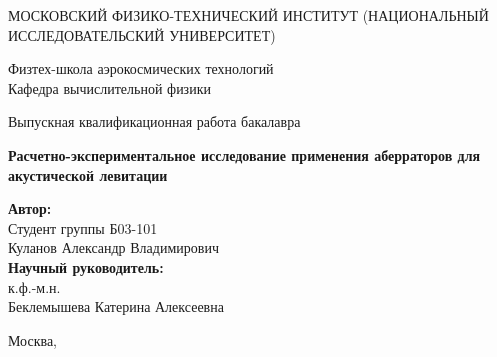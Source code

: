 \begin{center}
    \large МОСКОВСКИЙ ФИЗИКО-ТЕХНИЧЕСКИЙ ИНСТИТУТ (НАЦИОНАЛЬНЫЙ ИССЛЕДОВАТЕЛЬСКИЙ УНИВЕРСИТЕТ)
    \vspace{1cm}

    Физтех-школа аэрокосмических технологий \\

    Кафедра вычислительной физики \\

    \vspace{3em}

    Выпускная квалификационная работа бакалавра
\end{center}

\begin{center}
    \vspace{\fill}
    \LARGE\textbf{{Расчетно-экспериментальное исследование применения аберраторов для акустической левитации}}

    \vspace{\fill}
\end{center}


\begin{flushright}
    \textbf{Автор:} \\
    Студент группы Б03-101\\
    Куланов Александр Владимирович \\
    \vspace{2em}
    \textbf{Научный руководитель:} \\
    к.ф.-м.н.\\
    Беклемышева Катерина Алексеевна \\
    \vspace{2em}
\end{flushright}

\vspace{\fill}

\begin{center}
    Москва, \the\year{}
\end{center}

\thispagestyle{empty}

\newpage
\setcounter{page}{2}
\fancyfoot[c]{\thepage}
